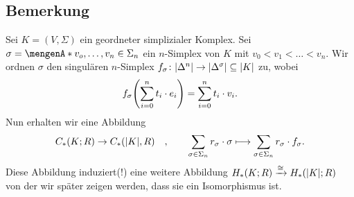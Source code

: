 \begin{enumerate}[1)]
%
\end{enumerate}

\subsection[Bemerkung: Vorgehen, um später zu zeigen: $H_*(K;R) \cong H_*(\abs*{K};R )$]{Bemerkung} %
\label{sub:511}
Sei $K=(V,\Sigma)$ ein geordneter simplizialer Komplex. Sei $\sigma= \set{v_o, \ldots , v_n} \in \Sigma_n $ ein $n$-Simplex von $K$ mit $v_0 < v_1 < \ldots < v_n$. Wir
ordnen $\sigma$ den singulären $n$-Simplex $f_\sigma \colon \abs*{\Delta^n} \to \abs*{\Delta^\sigma} \subseteq \abs*{K}$ zu, wobei
\begin{align*}
	f_\sigma \enbrace*{\sum_{i=0}^{n} t_i \cdot e_i} = \sum_{i=0}^{n} t_i \cdot v_i. 
\end{align*}
Nun erhalten wir eine Abbildung 
\[
	C_*(K;R) \to C_*(\abs*{K},R) \quad , \qquad   \sum_{\sigma \in \Sigma_n} r_\sigma \cdot \sigma \longmapsto \sum_{\sigma \in \Sigma_n} r_\sigma \cdot f_\sigma.
\]
Diese Abbildung induziert(!) eine weitere Abbildung $H_*(K;R) \xrightarrow{\cong} H_*(\abs*{K};R )$ von der wir später zeigen werden, dass sie ein Isomorphismus ist.
\newpage

